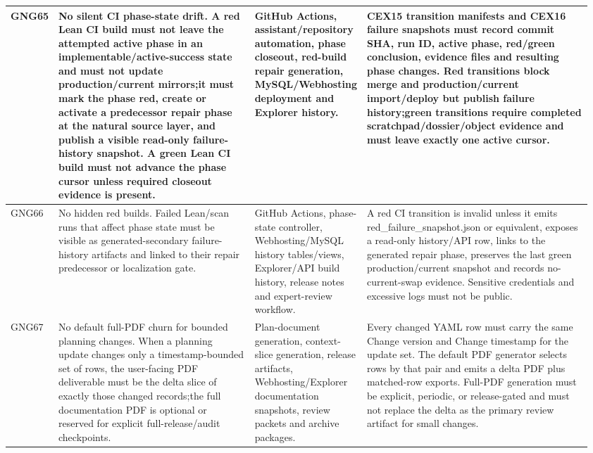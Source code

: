 \begin{longtable}{L{0.045\linewidth} L{0.345\linewidth} L{0.185\linewidth} L{0.39\linewidth}}
GNG65 & No silent CI phase-state drift. A red Lean CI build must not leave the attempted active phase in an implementable/\allowbreak{}active-success state and must not update production/\allowbreak{}current mirrors;\newline it must mark the phase red, create or activate a predecessor repair phase at the natural source layer, and publish a visible read-only failure-history snapshot. A green Lean CI build must not advance the phase cursor unless required closeout evidence is present. & GitHub Actions, assistant/\allowbreak{}repository automation, phase closeout, red-build repair generation, MySQL/\allowbreak{}Webhosting deployment and Explorer history. & CEX15 transition manifests and CEX16 failure snapshots must record commit SHA, run ID, active phase, red/\allowbreak{}green conclusion, evidence files and resulting phase changes. Red transitions block merge and production/\allowbreak{}current import/\allowbreak{}deploy but publish failure history;\newline green transitions require completed scratchpad/\allowbreak{}dossier/\allowbreak{}object evidence and must leave exactly one active cursor.\\
\hline
\addlinespace[0.24em]
GNG66 & No hidden red builds. Failed Lean/\allowbreak{}scan runs that affect phase state must be visible as generated-secondary failure-history artifacts and linked to their repair predecessor or localization gate. & GitHub Actions, phase-state controller, Webhosting/\allowbreak{}MySQL history tables/\allowbreak{}views, Explorer/\allowbreak{}API build history, release notes and expert-review workflow. & A red CI transition is invalid unless it emits red\_failure\_snapshot.json or equivalent, exposes a read-only history/\allowbreak{}API row, links to the generated repair phase, preserves the last green production/\allowbreak{}current snapshot and records no-current-swap evidence. Sensitive credentials and excessive logs must not be public.\\
\hline
\addlinespace[0.24em]
GNG67 & No default full-PDF churn for bounded planning changes. When a planning update changes only a timestamp-bounded set of rows, the user-facing PDF deliverable must be the delta slice of exactly those changed records;\newline the full documentation PDF is optional or reserved for explicit full-release/\allowbreak{}audit checkpoints. & Plan-document generation, context-slice generation, release artifacts, Webhosting/\allowbreak{}Explorer documentation snapshots, review packets and archive packages. & Every changed YAML row must carry the same Change version and Change timestamp for the update set. The default PDF generator selects rows by that pair and emits a delta PDF plus matched-row exports. Full-PDF generation must be explicit, periodic, or release-gated and must not replace the delta as the primary review artifact for small changes.\\

\end{longtable}
